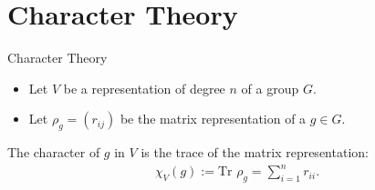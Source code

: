 \documentclass[10pt]{beamer}
\begin{document}
	
	
	\section{Character Theory}
	
	\begin{frame}{Character Theory}
		\begin{itemize}
						
			\item Let $V$ be a representation of degree $n$ of a group $G$. 
			
			\item Let $\rho_g = (r_{ij})$ be the matrix representation of a $g \in G$.\pause
	
		\end{itemize}
		\begin{definition}[Character]
			The \alert{character} of $g$ in $V$ is the trace of the matrix representation:
			\begin{align*}
				\chi_V(g) := \text{Tr } \rho_g = \sum_{i=1}^{n} r_{ii}.
			\end{align*}
		\end{definition}
	\end{frame}
	
\end{document}
